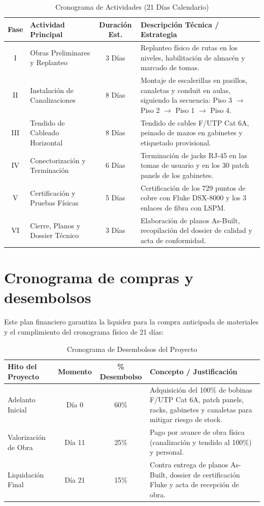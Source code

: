 \begin{table}[H]
\centering
\caption{Cronograma de Actividades (21 Días Calendario)}
\begin{tabularx}{\textwidth}{|c|l|c|X|}
\hline
\textbf{Fase} & \textbf{Actividad Principal} & \textbf{Duración Est.} & \textbf{Descripción Técnica / Estrategia} \\ \hline
I & Obras Preliminares y Replanteo & 3 Días & Replanteo físico de rutas en los \totalPisos{} niveles, habilitación de almacén y marcado de tomas. \\ \hline
II & Instalación de Canalizaciones & 8 Días & Montaje de escalerillas en pasillos, canaletas y conduit en aulas, siguiendo la secuencia: Piso 3 $\to$ Piso 2 $\to$ Piso 1 $\to$ Piso 4. \\ \hline
III & Tendido de Cableado Horizontal & 8 Días & Tendido de cables F/UTP Cat 6A, peinado de mazos en gabinetes y etiquetado provisional. \\ \hline
IV & Conectorización y Terminación & 6 Días & Terminación de jacks RJ-45 en las tomas de usuario y en los 30 patch panels de los gabinetes. \\ \hline
V & Certificación y Pruebas Físicas & 5 Días & Certificación de los 729 puntos de cobre con Fluke DSX-8000 y los 3 enlaces de fibra con LSPM. \\ \hline
VI & Cierre, Planos y Dossier Técnico & 3 Días & Elaboración de planos As-Built, recopilación del dossier de calidad y acta de conformidad. \\ \hline
\end{tabularx}
\end{table}

\section{Cronograma de compras y desembolsos}

Este plan financiero garantiza la liquidez para la compra anticipada de materiales y el cumplimiento del cronograma físico de 21 días:

\begin{table}[H]
\centering
\caption{Cronograma de Desembolsos del Proyecto}
\begin{tabularx}{\textwidth}{|l|c|c|X|}
\hline
\textbf{Hito del Proyecto} & \textbf{Momento} & \textbf{\% Desembolso} & \textbf{Concepto / Justificación} \\ \hline
Adelanto Inicial & Día 0 & 60\% & Adquisición del 100\% de bobinas F/UTP Cat 6A, patch panels, racks, gabinetes y canaletas para mitigar riesgo de stock. \\ \hline
Valorización de Obra & Día 11 & 25\% & Pago por avance de obra física (canalización y tendido al 100\%) y personal. \\ \hline
Liquidación Final & Día 21 & 15\% & Contra entrega de planos As-Built, dossier de certificación Fluke y acta de recepción de obra. \\ \hline
\end{tabularx}
\end{table}

